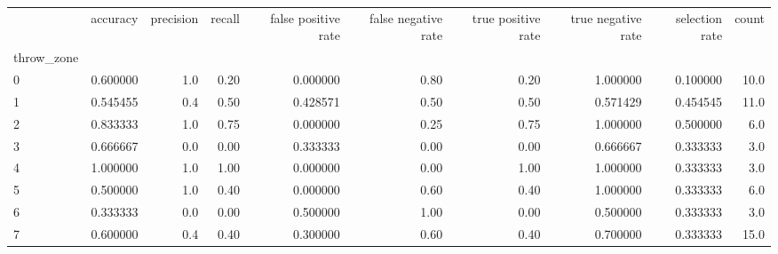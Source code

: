 \begin{tabular}{lrrrrrrrrr}
\toprule
{} &  accuracy &  precision &  recall &  false positive rate &  false negative rate &  true positive rate &  true negative rate &  selection rate &  count \\
throw\_zone &           &            &         &                      &                      &                     &                     &                 &        \\
\midrule
0          &  0.600000 &        1.0 &    0.20 &             0.000000 &                 0.80 &                0.20 &            1.000000 &        0.100000 &   10.0 \\
1          &  0.545455 &        0.4 &    0.50 &             0.428571 &                 0.50 &                0.50 &            0.571429 &        0.454545 &   11.0 \\
2          &  0.833333 &        1.0 &    0.75 &             0.000000 &                 0.25 &                0.75 &            1.000000 &        0.500000 &    6.0 \\
3          &  0.666667 &        0.0 &    0.00 &             0.333333 &                 0.00 &                0.00 &            0.666667 &        0.333333 &    3.0 \\
4          &  1.000000 &        1.0 &    1.00 &             0.000000 &                 0.00 &                1.00 &            1.000000 &        0.333333 &    3.0 \\
5          &  0.500000 &        1.0 &    0.40 &             0.000000 &                 0.60 &                0.40 &            1.000000 &        0.333333 &    6.0 \\
6          &  0.333333 &        0.0 &    0.00 &             0.500000 &                 1.00 &                0.00 &            0.500000 &        0.333333 &    3.0 \\
7          &  0.600000 &        0.4 &    0.40 &             0.300000 &                 0.60 &                0.40 &            0.700000 &        0.333333 &   15.0 \\
\bottomrule
\end{tabular}
